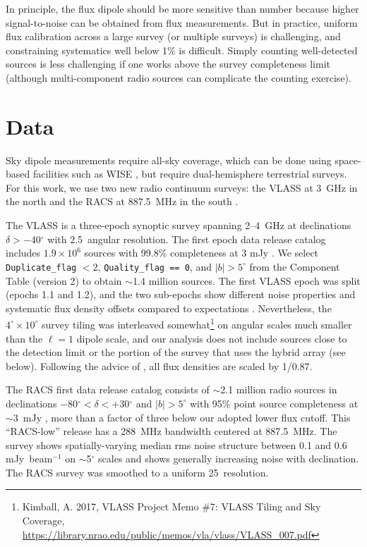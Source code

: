 \documentclass[twocolumn]{aastex63}
\begin{document}
In principle, the flux dipole should be more sensitive than number because higher signal-to-noise can be obtained
from flux measurements.  But in practice, uniform flux calibration across a large survey (or multiple surveys) is
challenging, and constraining systematics well below 1\% is difficult.  Simply counting well-detected sources
is less challenging if one works above the survey completeness limit (although multi-component radio sources
can complicate the counting exercise).


\section{\label{sec:data} Data}

Sky dipole measurements require all-sky coverage, which can be done using space-based
facilities such as WISE \citep{wright2010,secrest2021}, but require dual-hemisphere terrestrial surveys.
For this work, we use two new radio continuum surveys:  the VLASS at 3~GHz in the north \citep{vlass2020}
and the RACS at 887.5~MHz in the south \citep{racsI_2020}.

The VLASS is a three-epoch synoptic survey spanning 2--4~GHz at declinations $\delta > -$40$^\circ$ with
2.5\arcsec\ angular resolution.  The
first epoch data release catalog includes $1.9\times10^6$ sources with 99.8\% completeness at 3 mJy \citep{gordon2021}.
We select \texttt{Duplicate\_flag} $< 2$,
\texttt{Quality\_flag == 0}, and $|b| > 5^\circ$ from the Component Table (version 2) to obtain $\sim$1.4 million sources.
The first VLASS epoch was split (epochs 1.1 and 1.2), and the two sub-epochs show
different noise properties and systematic flux density offsets compared to expectations \citep{gordon2021}.
Nevertheless, the $4^\circ\times10^\circ$ survey tiling was
interleaved somewhat\footnote{Kimball, A. 2017, VLASS Project Memo \#7: VLASS Tiling and Sky
  Coverage, \url{https://library.nrao.edu/public/memos/vla/vlass/VLASS_007.pdf}} on angular scales much smaller
than the $\ell=1$ dipole scale, and our analysis does not include sources close to the detection limit or the portion
of the survey that uses the hybrid array (see below).
Following the advice of \citet{gordon2021}, all flux densities are scaled by 1/0.87.  

The RACS first data release catalog consists of $\sim$2.1 million radio sources in declinations
$-$80$^\circ < \delta < +$30$^\circ$ and $|b| > 5^\circ$ with 95\% point source completeness
at $\sim$3~mJy \citep{racsII_2021}, more than a factor of three below our adopted lower flux cutoff.
This ``RACS-low'' release has a 288~MHz bandwidth centered at 887.5~MHz.  The
survey shows spatially-varying median rms noise structure between 0.1 and 0.6 mJy~beam$^{-1}$ on
$\sim$5$^\circ$ scales and shows generally increasing noise with declination.  
The RACS survey was smoothed to a uniform 25\arcsec\ resolution.
\end{document}
